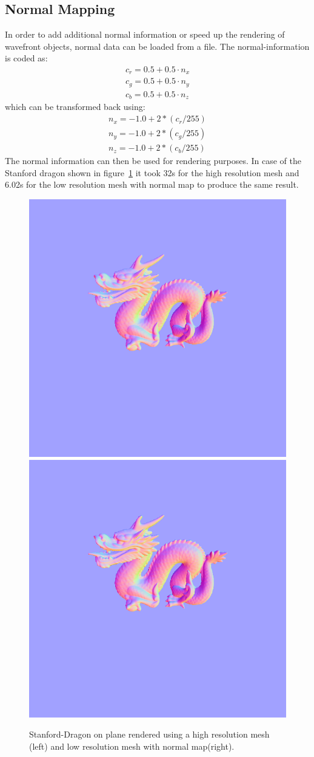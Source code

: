 \subsection{Normal Mapping}
In order to add additional normal information or speed up the rendering of wavefront objects, normal data can be loaded from a file. The normal-information is coded as:
\begin{align*}
c_r = 0.5 + 0.5 \cdot n_x \\
c_g = 0.5 + 0.5 \cdot n_y \\
c_b = 0.5 + 0.5 \cdot n_z
\end{align*}
which can be transformed back using:
\begin{align}
n_x = -1.0 + 2*(c_r/255) \\
n_y = -1.0 + 2*(c_g/255) \\
n_z = -1.0 + 2*(c_b/255)
\end{align}
The normal information can then be used for rendering purposes. In case of the Stanford dragon shown in figure~\ref{fig:dragonNormlMap} it took 32s for the high resolution mesh and 6.02s for the low resolution mesh with normal map to produce the same result. 
\begin{figure}
\centering
\includegraphics[width=0.33\linewidth]{./img/dragonHighResMap}
\includegraphics[width=0.33\linewidth]{./img/dragonNormlMap}
\caption{Stanford-Dragon on plane rendered using a high resolution mesh (left) and low resolution mesh with normal map(right).}
\label{fig:dragonNormlMap}
\end{figure}



